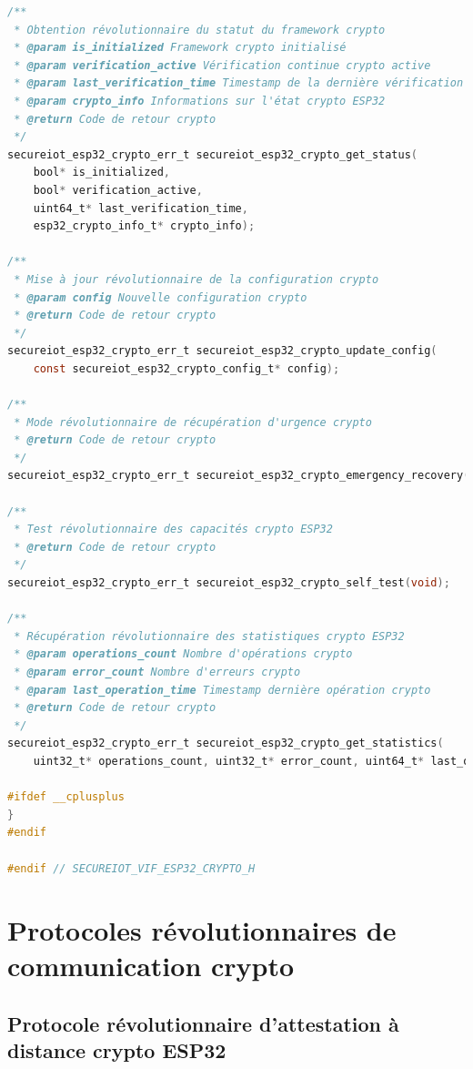 \begin{lstlisting}[language=C, caption={API révolutionnaire publique SecureIoT-VIF ESP32 crypto intégré}]
/**
 * Obtention révolutionnaire du statut du framework crypto
 * @param is_initialized Framework crypto initialisé
 * @param verification_active Vérification continue crypto active
 * @param last_verification_time Timestamp de la dernière vérification crypto
 * @param crypto_info Informations sur l'état crypto ESP32
 * @return Code de retour crypto
 */
secureiot_esp32_crypto_err_t secureiot_esp32_crypto_get_status(
    bool* is_initialized,
    bool* verification_active,
    uint64_t* last_verification_time,
    esp32_crypto_info_t* crypto_info);

/**
 * Mise à jour révolutionnaire de la configuration crypto
 * @param config Nouvelle configuration crypto
 * @return Code de retour crypto
 */
secureiot_esp32_crypto_err_t secureiot_esp32_crypto_update_config(
    const secureiot_esp32_crypto_config_t* config);

/**
 * Mode révolutionnaire de récupération d'urgence crypto
 * @return Code de retour crypto
 */
secureiot_esp32_crypto_err_t secureiot_esp32_crypto_emergency_recovery(void);

/**
 * Test révolutionnaire des capacités crypto ESP32
 * @return Code de retour crypto
 */
secureiot_esp32_crypto_err_t secureiot_esp32_crypto_self_test(void);

/**
 * Récupération révolutionnaire des statistiques crypto ESP32
 * @param operations_count Nombre d'opérations crypto
 * @param error_count Nombre d'erreurs crypto
 * @param last_operation_time Timestamp dernière opération crypto
 * @return Code de retour crypto
 */
secureiot_esp32_crypto_err_t secureiot_esp32_crypto_get_statistics(
    uint32_t* operations_count, uint32_t* error_count, uint64_t* last_operation_time);

#ifdef __cplusplus
}
#endif

#endif // SECUREIOT_VIF_ESP32_CRYPTO_H
\end{lstlisting}

\section{Protocoles révolutionnaires de communication crypto}

\subsection{Protocole révolutionnaire d'attestation à distance crypto ESP32}


